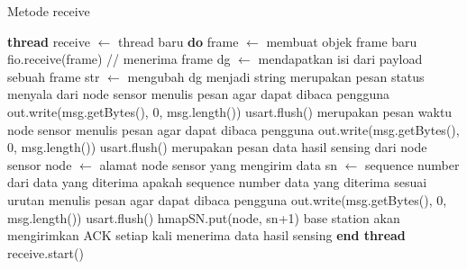 \begin{algorithm}[htbp]
\caption{Metode receive}
\begin{algorithmic}[1]
    \State \textbf{thread} receive $\leftarrow$ thread baru \textbf{do}
        \Indent
                \State frame $\leftarrow$ membuat objek frame baru
                    \try
                        \State fio.receive(frame) // menerima frame
                        \State dg $\leftarrow$ mendapatkan isi dari payload sebuah frame
                        \State str $\leftarrow$ mengubah dg menjadi string
                            \State merupakan pesan status menyala dari node sensor
                            \try
                                \State menulis pesan agar dapat dibaca pengguna
                                \State out.write(msg.getBytes(), 0, msg.length())
                                \State usart.flush()
                            \endtry
                            \State merupakan pesan waktu node sensor
                            \try
                                \State menulis pesan agar dapat dibaca pengguna
                                \State out.write(msg.getBytes(), 0, msg.length())
                                \State usart.flush()
                            \endtry
                            \State merupakan pesan data hasil sensing dari node sensor
                            \State node $\leftarrow$ alamat node sensor yang mengirim data
                            \State sn $\leftarrow$ sequence number dari data yang diterima
                                \State apakah sequence number data yang diterima sesuai urutan 
                                \try
                                    \State menulis pesan agar dapat dibaca pengguna
                                    \State out.write(msg.getBytes(), 0, msg.length()) 
                                    \State usart.flush()
                                \endtry
                                \State hmapSN.put(node, sn+1)
                            \EndIf
                            \State base station akan mengirimkan ACK setiap kali menerima data hasil sensing
                        \EndIf
                    \endtry
                \EndWhile
            \EndFunction
        \EndIndent
    \State \textbf{end thread}
    \State receive.start()
\EndFunction
\end{algorithmic}
\end{algorithm}

